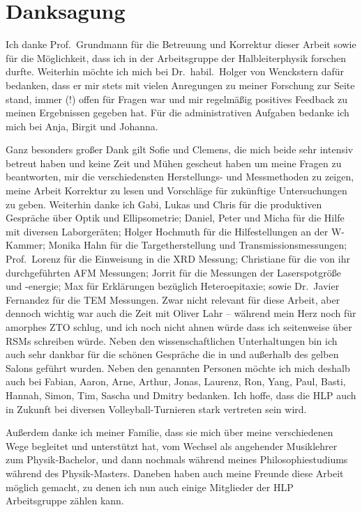 \chapter*{Danksagung}
Ich danke Prof.\ Grundmann für die Betreuung und Korrektur dieser Arbeit sowie für die Möglichkeit, dass ich in der Arbeitsgruppe der Halbleiterphysik forschen durfte.
Weiterhin möchte ich mich bei Dr.\ habil.\ Holger von Wenckstern dafür bedanken, dass er mir stets mit vielen Anregungen zu meiner Forschung zur Seite stand, immer (!) offen für Fragen war und mir regelmäßig positives Feedback zu meinen Ergebnissen gegeben hat.
Für die administrativen Aufgaben bedanke ich mich bei Anja, Birgit und Johanna.

Ganz besonders großer Dank gilt Sofie und Clemens, die mich beide sehr intensiv betreut haben und keine Zeit und Mühen gescheut haben um meine Fragen zu beantworten, mir die verschiedensten Herstellungs- und Messmethoden zu zeigen, meine Arbeit Korrektur zu lesen und Vorschläge für zukünftige Untersuchungen zu geben.
Weiterhin danke ich Gabi, Lukas und Chris für die produktiven Gespräche über Optik und Ellipsometrie;
Daniel, Peter und Micha für die Hilfe mit diversen Laborgeräten;
Holger Hochmuth für die Hilfestellungen an der W-Kammer;
Monika Hahn für die Targetherstellung und Transmissionsmessungen;
Prof.\ Lorenz für die Einweisung in die XRD Messung;
Christiane für die von ihr durchgeführten AFM Messungen;
Jorrit für die Messungen der Laserspotgröße und -energie;
Max für Erklärungen bezüglich Heteroepitaxie;
sowie Dr.\ Javier Fernandez für die TEM Messungen.
Zwar nicht relevant für diese Arbeit, aber dennoch wichtig war auch die Zeit mit Oliver Lahr -- während mein Herz noch für amorphes ZTO schlug, und ich noch nicht ahnen würde dass ich seitenweise über RSMs schreiben würde.
Neben den wissenschaftlichen Unterhaltungen bin ich auch sehr dankbar für die schönen Gespräche die in und außerhalb des gelben Salons geführt wurden.
Neben den genannten Personen möchte ich mich deshalb auch bei
Fabian, Aaron, Arne, Arthur, Jonas, Laurenz, Ron, Yang, Paul, Basti, Hannah, Simon, Tim, Sascha und Dmitry bedanken.
Ich hoffe, dass die HLP auch in Zukunft bei diversen Volleyball-Turnieren stark vertreten sein wird.

Außerdem danke ich meiner Familie, dass sie mich über meine verschiedenen Wege begleitet und unterstützt hat, vom Wechsel als angehender Musiklehrer zum Physik-Bachelor, und dann nochmals während meines Philosophiestudiums während des Physik-Masters.
Daneben haben auch meine Freunde diese Arbeit möglich gemacht, zu denen ich nun auch einige Mitglieder der HLP Arbeitsgruppe zählen kann.